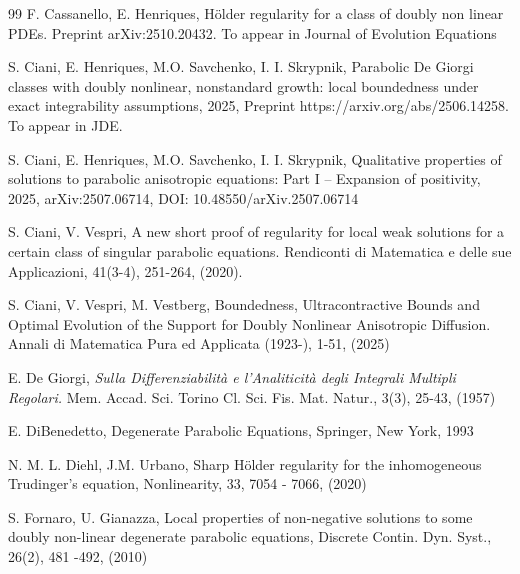 \documentclass[a4paper,11pt,fullpage]{article}
\numberwithin{equation}{section}
\begin{document}
\begin{thebibliography}{99}
 {F. Cassanello, E. Henriques}, H\"older regularity for a class of doubly non linear PDEs. Preprint arXiv:2510.20432. To appear in Journal of Evolution Equations

S. Ciani, E. Henriques, M.O. Savchenko, I. I. Skrypnik,
Parabolic De Giorgi classes with doubly nonlinear, nonstandard growth: local boundedness under exact integrability assumptions, 
2025, Preprint https://arxiv.org/abs/2506.14258. To appear in JDE. 

S. Ciani, E. Henriques, M.O. Savchenko, I. I. Skrypnik,
Qualitative properties of solutions to parabolic anisotropic equations: Part I -- Expansion of positivity, 
2025, arXiv:2507.06714, DOI: 10.48550/arXiv.2507.06714



 S. Ciani, V. Vespri, A new short proof of regularity for local weak solutions for a certain class of singular parabolic equations. Rendiconti di Matematica e delle sue Applicazioni, 41(3-4), 251-264, (2020).

 S. Ciani, V. Vespri, M. Vestberg, Boundedness, Ultracontractive Bounds and Optimal Evolution of the Support for Doubly Nonlinear Anisotropic Diffusion. Annali di Matematica Pura ed Applicata (1923-), 1-51, (2025)

 E. De Giorgi, {\it Sulla Differenziabilit\`a e l'Analiticit\`a degli Integrali Multipli Regolari.} Mem. Accad. Sci. Torino Cl. Sci. Fis. Mat. Natur., 3(3), 25-43, (1957)

E. DiBenedetto, Degenerate Parabolic Equations, Springer, New York, 1993


N. M. L. Diehl, J.M. Urbano, Sharp H\"older regularity for the inhomogeneous Trudinger's equation, Nonlinearity, {33}, 7054 - 7066, (2020)

S. Fornaro, U. Gianazza, Local properties of non-negative solutions to some doubly non-linear degenerate parabolic equations,
Discrete Contin. Dyn. Syst., {26}(2), 481 -492, (2010)


\end{thebibliography}
\end{document}
